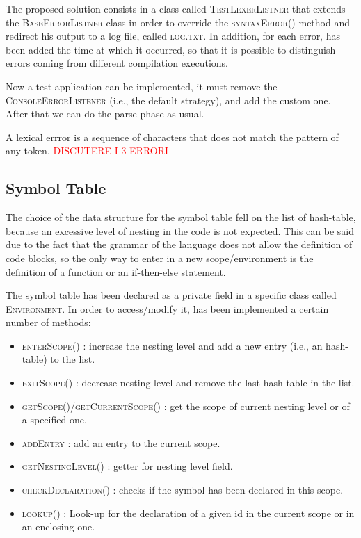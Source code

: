 \documentclass[11pt]{article} %
\newcommand{\ES}{\textcolor{red}}
\begin{document}
The proposed solution consists in a class called \textsc{TestLexerListner} that extends the \textsc{BaseErrorListner} class in order to override the \textsc{syntaxError()} method and redirect his output to a log file, called \textsc{log.txt}. In addition, for each error, has been added the time at which it occurred, so that it is possible to distinguish errors coming from different compilation executions. 

\medskip

Now a test application can be implemented, it must remove the \textsc{ConsoleErrorListener} (i.e., the default strategy), and add the custom one. After that we can do the parse phase as usual.

A lexical errror is a sequence of characters that does not match the pattern of any token.
\ES{DISCUTERE I 3 ERRORI}
%


\subsection{Symbol Table}
The choice of the data structure for the symbol table fell on the list of hash-table, because an excessive level of nesting in the code is not expected. This can be said due to the fact that the grammar of the language does not allow the definition of code blocks, so the only way to enter in a new scope/environment is the definition of a function or an if-then-else statement. 

\medskip

The symbol table has been declared as a private field in a specific class called \textsc{Environment}. In order to access/modify it, has been implemented a certain number of methods:
\begin{itemize}
\item \textsc{enterScope()} : increase the nesting level and add a new entry (i.e., an hash-table) to the list. 
\item \textsc{exitScope()} : decrease nesting level and remove the last hash-table in the list.
\item \textsc{getScope()}/\textsc{getCurrentScope()} : get the scope of current nesting level or of a specified one.
\item \textsc{addEntry} : add an entry to the current scope.
\item \textsc{getNestingLevel()} : getter for nesting level field.
\item \textsc{checkDeclaration()} : checks if the symbol has been declared in this scope. 
\item \textsc{lookup()} : Look-up for the declaration of a given id in the current scope or in an enclosing one. 
\end{itemize}
\end{document}
